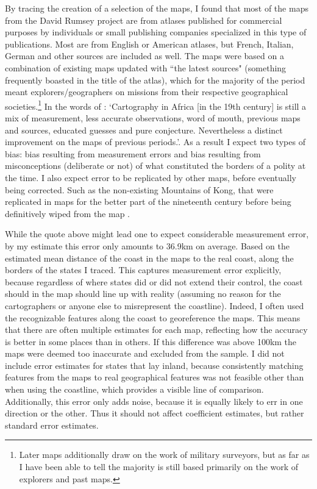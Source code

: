 \documentclass[12pt]{article}
\begin{document}
By tracing the creation of a selection of the maps, I found that most of the
maps from the David Rumsey project are from atlases published for commercial
purposes by individuals or small publishing companies specialized in this type
of publications. Most are from English or American atlases, but French, Italian,
German and other sources are included as well. The maps were based on a
combination of existing maps updated with ``the latest sources" (something
frequently boasted in the title of the atlas), which for the majority of the
period meant explorers/geographers on missions from their respective
geographical societies.\footnote{Later maps additionally draw on the work of
	military surveyors, but as far as I have been able to tell the majority
is still based primarily on the work of explorers and past maps.} In the words
of \citet[47-48]{Stone1995}: `Cartography in Africa [in the 19th century] is
still a mix of measurement, less accurate observations, word of mouth, previous
maps and sources, educated guesses and pure conjecture. Nevertheless a distinct
improvement on the maps of previous periods.'. As a result I expect two types of
bias: bias resulting from measurement errors and bias resulting from
misconceptions (deliberate or not) of what constituted the borders of a polity
at the time. I also expect error to be replicated by other maps, before
eventually being corrected. Such as the non-existing Mountains of Kong, that
were replicated in maps for the better part of the nineteenth century before
being definitively wiped from the map \citep{Bassett_1991}.

While the quote above might lead one to expect considerable measurement error,
by my estimate this error only amounts to 36.9km on average. Based on the
estimated mean distance of the coast in the maps to the real coast, along the
borders of the states I traced. This captures measurement error explicitly,
because regardless of where states did or did not extend their control, the
coast should in the map should line up with reality (assuming no reason for the
cartographers or anyone else to misrepresent the coastline). Indeed, I often
used the recognizable features along the coast to georeference the maps. This
means that there are often multiple estimates for each map, reflecting how the
accuracy is better in some places than in others. If this difference was above
100km the maps were deemed too inaccurate and excluded from the sample. I did
not include error estimates for states that lay inland, because consistently
matching features from the maps to real geographical features was not feasible
other than when using the coastline, which provides a visible line of
comparison. Additionally, this error only adds noise, because it is equally
likely to err in one direction or the other. Thus it should not affect 
coefficient estimates, but rather standard error estimates.
\end{document}

